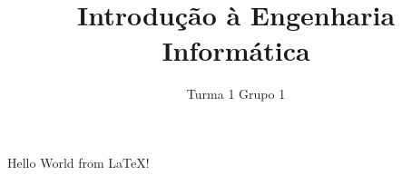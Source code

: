 \documentclass[11pt,openright,twoside]{report}
\title{\textbf{Introdução à Engenharia Informática}}
\author{Turma 1 Grupo 1}
\date{}
\begin{document}
\maketitle
Hello World from \LaTeX!
\end{document}
